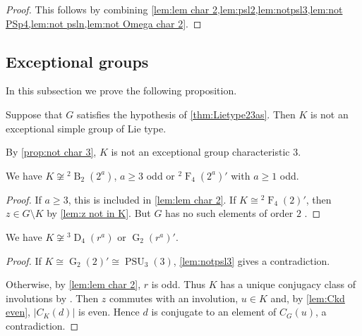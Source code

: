 \documentclass[12pt,a4paper]{amsart}
\DeclareMathOperator{\B}{B}
\DeclareMathOperator{\D}{D}
\DeclareMathOperator{\F}{F}
\DeclareMathOperator{\G}{G}
\DeclareMathOperator{\PSU}{PSU}
\begin{document}
\begin{proof} This follows by combining  \cref{lem:lem char 2,lem:psl2,lem:notpsl3,lem:not PSp4,lem:not psln,lem:not Omega char 2}.
\end{proof}





\subsection{Exceptional groups}

In this subsection we prove the following proposition.

\begin{proposition}\label{prop:not excep}  Suppose that $G$ satisfies the hypothesis of \cref{thm:Lietype23as}. Then $K$ is not an exceptional simple group of Lie type.
\end{proposition}


By \cref{prop:not char 3},   $K$ is not an exceptional group characteristic $3$.



\begin{lemma}\label{lem:suzuki or large ree}
We have $K \not\cong {}^2\B_2(2^a)$, $a \ge 3$ odd or ${}^2\F_4(2^a)'$ with $a\ge 1$ odd.
\end{lemma}

\begin{proof}  If $a \ge 3$, this is included in \cref{lem:lem char 2}. If $K \cong {}^2\F_4(2)'$,   then $z \in G\setminus K$ by \cref{lem:z not in K}. But $G$ has no such elements of order $2$ \cite[Theorem 3.3.2 (d)]{GLS3}.
\end{proof}


\begin{lemma}\label{lem:not G2 or 3D4}  We have  $K \not \cong {}^3\D_4(r^a)$ or $\G_2(r^a)'$.
\end{lemma}

\begin{proof}  If $K \cong \G_2(2)'\cong \PSU_3(3)$,  \cref{lem:notpsl3} gives a contradiction.

Otherwise, by \cref{lem:lem char 2},  $r$ is odd. Thus $K$ has a unique conjugacy class of involutions by \cite[Table 4.5.1]{GLS3}. Then  $z$ commutes with an involution, $u\in K$  and, by \cref{lem:Ckd even}, $|C_K(d)|$ is even. Hence $d$ is conjugate to an element of $C_G(u)$, a contradiction.
\end{proof}
\end{document}
